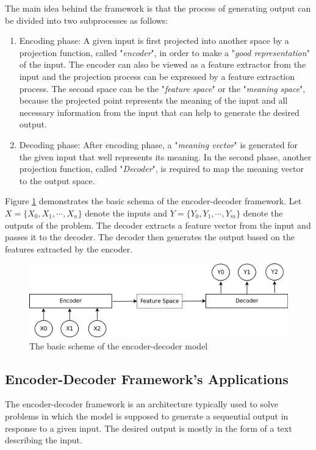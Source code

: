 \documentclass[preprint, 12pt]{elsarticle}
\begin{document}
		The main idea behind the framework is that the process of generating output can be divided into two subprocesses as follows:
		\begin{enumerate}
			\item Encoding phase: A given input is first projected into another space by a projection function, called "\textit{encoder}", in order to make a "\textit{good representation}" of the input. The encoder can also be viewed as a feature extractor from the input and the projection process can be expressed by a feature extraction process. The second space can be the "\textit{feature space}" or the "\textit{meaning space}", because the projected point represents the meaning of the input and all necessary information from the input that can help to generate the desired output.
			\item Decoding phase: After encoding phase, a "\textit{meaning vector}" is generated for the given input that well represents its meaning. In the second phase, another projection function, called "\textit{Decoder}", is required to map the meaning vector to the output space.
		\end{enumerate} 
	
		Figure \ref{fig:encdec} demonstrates the basic schema of the encoder-decoder framework. Let $X = \{X_0, X_1, \cdots, X_n\}$ denote the inputs and $Y = \{Y_0, Y_1, \cdots, Y_m\}$ denote the outputs of the problem. The decoder extracts a feature vector from the input and passes it to the decoder. The decoder then generates the output based on the features extracted by the encoder.
		\begin{figure}[H]
			\centering
			\includegraphics[scale=0.5]{Imgs/encoder_decoder.png}
			\caption{The basic scheme of the encoder-decoder model}
			\label{fig:encdec}
		\end{figure}
		
		\subsection{Encoder-Decoder Framework's Applications}
		The encoder-decoder framework is an architecture typically used to solve problems in which the model is supposed to generate a sequential output in response to a given input. The desired output is mostly in the form of a text describing the input.
		
\end{document}

